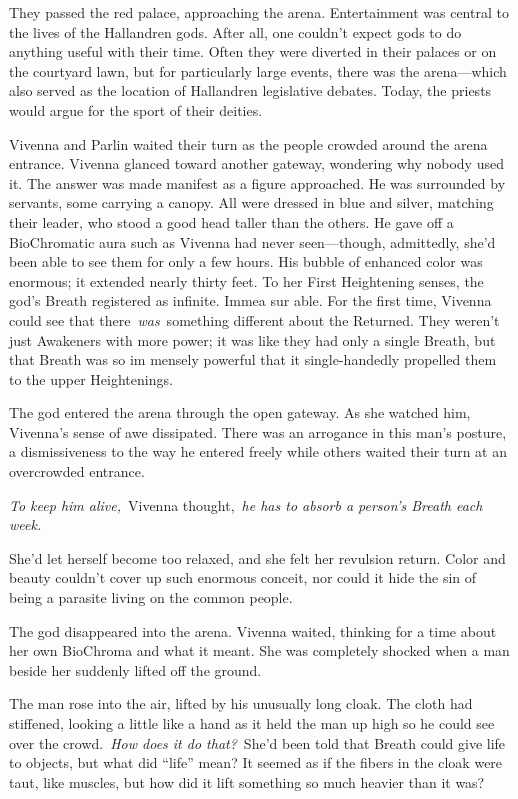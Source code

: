 They passed the red palace, approaching the arena. Entertainment was central to the lives of the Hallandren gods. After all, one couldn’t expect gods to do anything useful with their time. Often they were diverted in their palaces or on the courtyard lawn, but for particularly large events, there was the arena—which also served as the location of Hallandren legislative debates. Today, the priests would argue for the sport of their deities.

Vivenna and Parlin waited their turn as the people crowded around the arena entrance. Vivenna glanced toward another gateway, wondering why nobody used it. The answer was made manifest as a figure approached. He was surrounded by servants, some carrying a canopy. All were dressed in blue and silver, matching their leader, who stood a good head taller than the others. He gave off a BioChromatic aura such as Vivenna had never seen—though, admittedly, she’d been able to see them for only a few hours. His bubble of enhanced color was enormous; it extended nearly thirty feet. To her First Heightening senses, the god’s Breath registered as infinite. Immea sur able. For the first time, Vivenna could see that there~\textit{was}~something different about the Returned. They weren’t just Awakeners with more power; it was like they had only a single Breath, but that Breath was so im mensely powerful that it single-handedly propelled them to the upper Heightenings.

The god entered the arena through the open gateway. As she watched him, Vivenna’s sense of awe dissipated. There was an arrogance in this man’s posture, a dismissiveness to the way he entered freely while others waited their turn at an overcrowded entrance.

\textit{To keep him alive,}~Vivenna thought,~\textit{he has to absorb a person’s Breath each week.}

She’d let herself become too relaxed, and she felt her revulsion return. Color and beauty couldn’t cover up such enormous conceit, nor could it hide the sin of being a parasite living on the common people.

The god disappeared into the arena. Vivenna waited, thinking for a time about her own BioChroma and what it meant. She was completely shocked when a man beside her suddenly lifted off the ground.

The man rose into the air, lifted by his unusually long cloak. The cloth had stiffened, looking a little like a hand as it held the man up high so he could see over the crowd.~\textit{How does it do that?}~She’d been told that Breath could give life to objects, but what did “life” mean? It seemed as if the fibers in the cloak were taut, like muscles, but how did it lift something so much heavier than it was?

